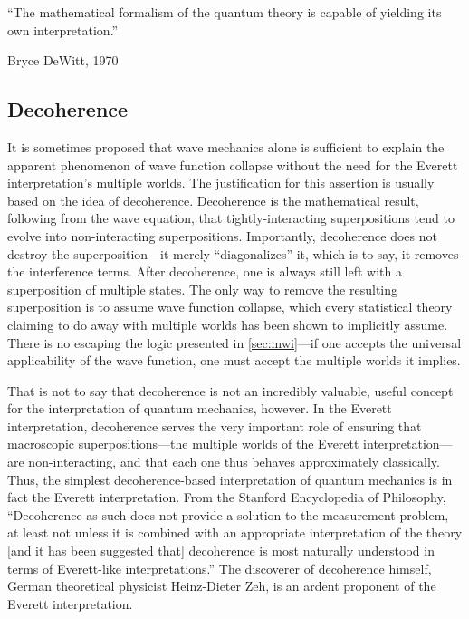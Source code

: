 \documentclass[
    12pt,
    letterpaper,
    aps,
    prd,
    longbibliography,
    twocolumn,
    nofootinbib,
    raggedbottom,
    amsmath,
    amssymb,
    amsfonts,
]{revtex4-1}
\begin{document}
\epigraph{``The mathematical formalism of the quantum theory is capable of yielding its own interpretation.''\cite{dewitt}}{Bryce DeWitt, 1970}

\subsection{Decoherence}

It is sometimes proposed that wave mechanics alone is sufficient to explain the apparent phenomenon of wave function collapse without the need for the Everett interpretation's multiple worlds. The justification for this assertion is usually based on the idea of decoherence. Decoherence is the mathematical result, following from the wave equation, that tightly-interacting superpositions tend to evolve into non-interacting superpositions.\cite{zurek}\cite{decoherence} Importantly, decoherence does not destroy the superposition---it merely ``diagonalizes'' it, which is to say, it removes the interference terms.\cite{zurek} After decoherence, one is always still left with a superposition of multiple states.\cite{stanford}\cite{wallacedecoherence} The only way to remove the resulting superposition is to assume wave function collapse, which every statistical theory claiming to do away with multiple worlds has been shown to implicitly assume.\cite{zehdecoherence}\cite{bornproof3} There is no escaping the logic presented in \autoref{sec:mwi}---if one accepts the universal applicability of the wave function, one must accept the multiple worlds it implies.

That is not to say that decoherence is not an incredibly valuable, useful concept for the interpretation of quantum mechanics, however. In the Everett interpretation, decoherence serves the very important role of ensuring that macroscopic superpositions---the multiple worlds of the Everett interpretation---are non-interacting, and that each one thus behaves approximately classically.\cite{zehdecoherence}\cite{wallacedecoherence} Thus, the simplest decoherence-based interpretation of quantum mechanics is in fact the Everett interpretation. From the Stanford Encyclopedia of Philosophy, ``Decoherence as such does not provide a solution to the measurement problem, at least not unless it is combined with an appropriate interpretation of the theory [and it has been suggested that] decoherence is most naturally understood in terms of Everett-like interpretations.''\cite{stanford} The discoverer of decoherence himself, German theoretical physicist Heinz-Dieter Zeh, is an ardent proponent of the Everett interpretation.\cite{zehbohm}\cite{arrowoftime}
\end{document}
